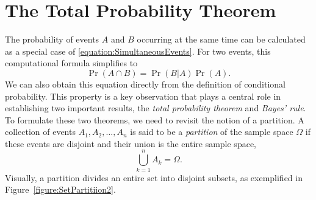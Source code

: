 \section{The Total Probability Theorem}

The probability of events $A$ and $B$ occurring at the same time can be calculated as a special case of \eqref{equation:SimultaneousEvents}.
For two events, this computational formula simplifies to
\begin{equation} \label{equation:ProbabilityIntersection}
\Pr (A \cap B) = \Pr (B|A) \Pr (A) .
\end{equation}
We can also obtain this equation directly from the definition of conditional probability.
This property is a key observation that plays a central role in establishing two important results, the \emph{total probability theorem} and \emph{Bayes' rule}.
To formulate these two theorems, we need to revisit the notion of a partition.
A collection of events $A_1, A_2, \ldots, A_n$ is said to be a \emph{partition} of the sample space $\Omega$ if these events are disjoint and their union is the entire sample space, 
\begin{equation*}
\bigcup_{k=1}^n A_k = \Omega .
\end{equation*}
Visually, a partition divides an entire set into disjoint subsets, as exemplified in Figure~\ref{figure:SetPartitiion2}.

